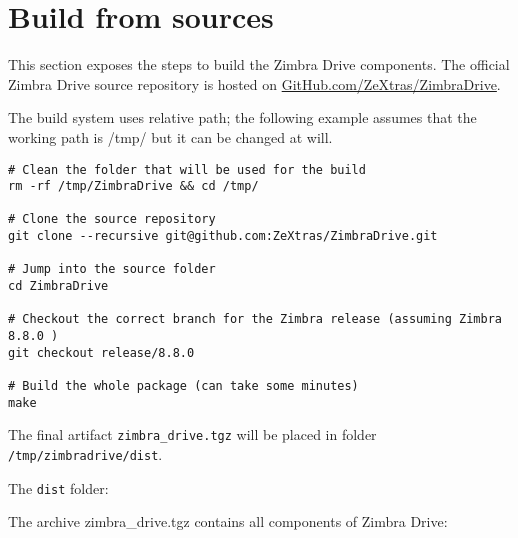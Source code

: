 \section{Build from sources}
This section exposes the steps to build the Zimbra Drive components.
The official Zimbra Drive source repository is hosted on \href{https://github.com/ZeXtras/ZimbraDrive}{GitHub.com/ZeXtras/ZimbraDrive}.

The build system uses relative path; the following example assumes that the working path is /tmp/
but it can be changed at will.
\begin{verbatim}
# Clean the folder that will be used for the build
rm -rf /tmp/ZimbraDrive && cd /tmp/

# Clone the source repository
git clone --recursive git@github.com:ZeXtras/ZimbraDrive.git

# Jump into the source folder
cd ZimbraDrive

# Checkout the correct branch for the Zimbra release (assuming Zimbra 8.8.0 )
git checkout release/8.8.0

# Build the whole package (can take some minutes)
make
\end{verbatim}

The final artifact \texttt{zimbra\_drive.tgz} will be placed in folder \texttt{/tmp/zimbradrive/dist}.

The \texttt{dist} folder:

The archive zimbra\_drive.tgz contains all components of Zimbra Drive:

